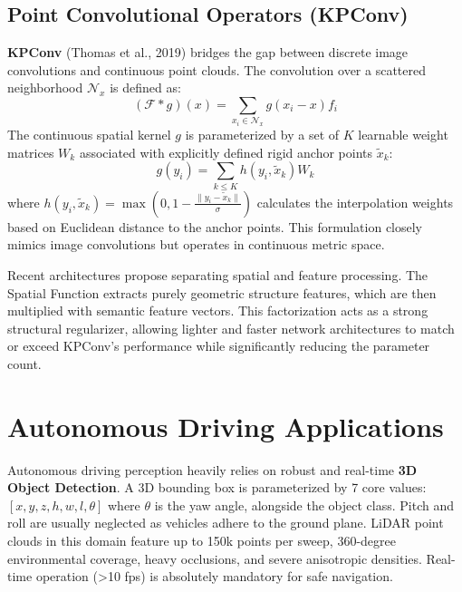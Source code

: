 \subsection{Point Convolutional Operators (KPConv)}
\textbf{KPConv} (Thomas et al., 2019) bridges the gap between discrete image convolutions and continuous point clouds. The convolution over a scattered neighborhood $\mathcal{N}_x$ is defined as:
\begin{equation}
(\mathcal{F} * g)(x) = \sum_{x_i \in \mathcal{N}_x} g(x_i - x) f_i
\end{equation}
The continuous spatial kernel $g$ is parameterized by a set of $K$ learnable weight matrices $W_k$ associated with explicitly defined rigid anchor points $\tilde{x}_k$:
\begin{equation}
g(y_i) = \sum_{k \le K} h(y_i, \tilde{x}_k) W_k
\end{equation}
where $h(y_i, \tilde{x}_k) = \max \left(0, 1 - \frac{\|y_i - \tilde{x}_k\|}{\sigma} \right)$ calculates the interpolation weights based on Euclidean distance to the anchor points. This formulation closely mimics image convolutions but operates in continuous metric space.

\begin{insightbox}
Recent architectures propose separating spatial and feature processing. The Spatial Function extracts purely geometric structure features, which are then multiplied with semantic feature vectors. This factorization acts as a strong structural regularizer, allowing lighter and faster network architectures to match or exceed KPConv's performance while significantly reducing the parameter count.
\end{insightbox}

\section{Autonomous Driving Applications}

Autonomous driving perception heavily relies on robust and real-time \textbf{3D Object Detection}. A 3D bounding box is parameterized by 7 core values: $[x, y, z, h, w, l, \theta]$ where $\theta$ is the yaw angle, alongside the object class. Pitch and roll are usually neglected as vehicles adhere to the ground plane. LiDAR point clouds in this domain feature up to 150k points per sweep, 360-degree environmental coverage, heavy occlusions, and severe anisotropic densities. Real-time operation (>10 fps) is absolutely mandatory for safe navigation.

